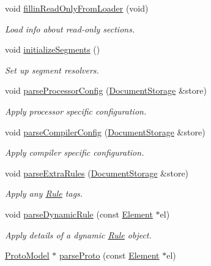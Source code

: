 \begin{DoxyCompactItemize}
void \mbox{\hyperlink{class_architecture_a74b374a6d9b25a638567c3519ac1796c}{fillin\+Read\+Only\+From\+Loader}} (void)
\begin{DoxyCompactList}\small\item\em Load info about read-\/only sections. \end{DoxyCompactList}\item 
void \mbox{\hyperlink{class_architecture_a20fb7a8902a213abbf0c730fa5b6a9d7}{initialize\+Segments}} ()
\begin{DoxyCompactList}\small\item\em Set up segment resolvers. \end{DoxyCompactList}\item 
void \mbox{\hyperlink{class_architecture_a4cd4815cc79c6582840043de2e3e65eb}{parse\+Processor\+Config}} (\mbox{\hyperlink{class_document_storage}{Document\+Storage}} \&store)
\begin{DoxyCompactList}\small\item\em Apply processor specific configuration. \end{DoxyCompactList}\item 
void \mbox{\hyperlink{class_architecture_a20147b2a4be785c30ea29cc7d9278b42}{parse\+Compiler\+Config}} (\mbox{\hyperlink{class_document_storage}{Document\+Storage}} \&store)
\begin{DoxyCompactList}\small\item\em Apply compiler specific configuration. \end{DoxyCompactList}\item 
void \mbox{\hyperlink{class_architecture_a568ff11996bb679327d3d83dbb50d454}{parse\+Extra\+Rules}} (\mbox{\hyperlink{class_document_storage}{Document\+Storage}} \&store)
\begin{DoxyCompactList}\small\item\em Apply any \mbox{\hyperlink{class_rule}{Rule}} tags. \end{DoxyCompactList}\item 
void \mbox{\hyperlink{class_architecture_aef6b370b90db6fbf3a8b8b62740c77ba}{parse\+Dynamic\+Rule}} (const \mbox{\hyperlink{class_element}{Element}} $\ast$el)
\begin{DoxyCompactList}\small\item\em Apply details of a dynamic \mbox{\hyperlink{class_rule}{Rule}} object. \end{DoxyCompactList}\item 
\mbox{\hyperlink{class_proto_model}{Proto\+Model}} $\ast$ \mbox{\hyperlink{class_architecture_afb2938da725012462a68a85627a2dc2c}{parse\+Proto}} (const \mbox{\hyperlink{class_element}{Element}} $\ast$el)

\end{DoxyCompactItemize}
